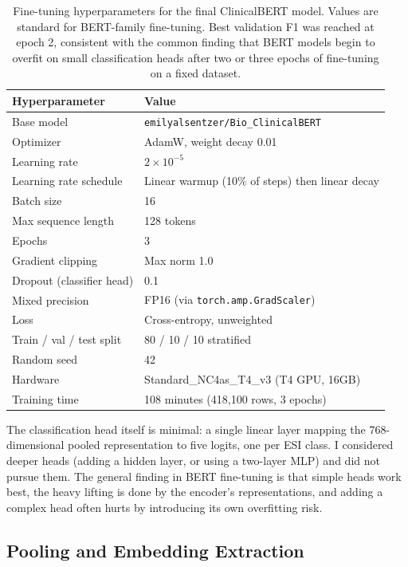 \begin{table}[htbp]
 \centering
 \caption[Bio\_ClinicalBERT fine-tuning configuration]{Fine-tuning hyperparameters for the final ClinicalBERT model. Values are standard for BERT-family fine-tuning. Best validation F1 was reached at epoch 2, consistent with the common finding that BERT models begin to overfit on small classification heads after two or three epochs of fine-tuning on a fixed dataset.}
 \label{tab:finetune-config}
 \small
 \begin{tabular}{ll}
 \toprule
 Hyperparameter & Value \\
 \midrule
 Base model & \texttt{emilyalsentzer/Bio\_ClinicalBERT} \\
 Optimizer & AdamW, weight decay 0.01 \\
 Learning rate & $2 \times 10^{-5}$ \\
 Learning rate schedule & Linear warmup (10\% of steps) then linear decay \\
 Batch size & 16 \\
 Max sequence length & 128 tokens \\
 Epochs & 3 \\
 Gradient clipping & Max norm 1.0 \\
 Dropout (classifier head) & 0.1 \\
 Mixed precision & FP16 (via \texttt{torch.amp.GradScaler}) \\
 Loss & Cross-entropy, unweighted \\
 Train / val / test split & 80 / 10 / 10 stratified \\
 Random seed & 42 \\
 Hardware & Standard\_NC4as\_T4\_v3 (T4 GPU, 16GB) \\
 Training time & 108 minutes (418{,}100 rows, 3 epochs) \\
 \bottomrule
 \end{tabular}
\end{table}

The classification head itself is minimal: a single linear layer mapping the 768-dimensional pooled representation to five logits, one per ESI class. I considered deeper heads (adding a hidden layer, or using a two-layer MLP) and did not pursue them. The general finding in BERT fine-tuning is that simple heads work best, the heavy lifting is done by the encoder's representations, and adding a complex head often hurts by introducing its own overfitting risk.

\subsection*{Pooling and Embedding Extraction}


